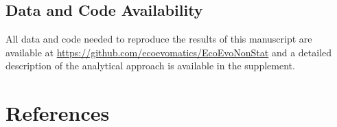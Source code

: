 \documentclass[
]{article}
\begin{document}
\hypertarget{data-and-code-availability}{%
\subsection{Data and Code
Availability}\label{data-and-code-availability}}

All data and code needed to reproduce the results of this manuscript are
available at \url{https://github.com/ecoevomatics/EcoEvoNonStat} and a
detailed description of the analytical approach is available in the
supplement.

\clearpage

\hypertarget{references}{%
\section*{References}\label{references}}
\end{document}
